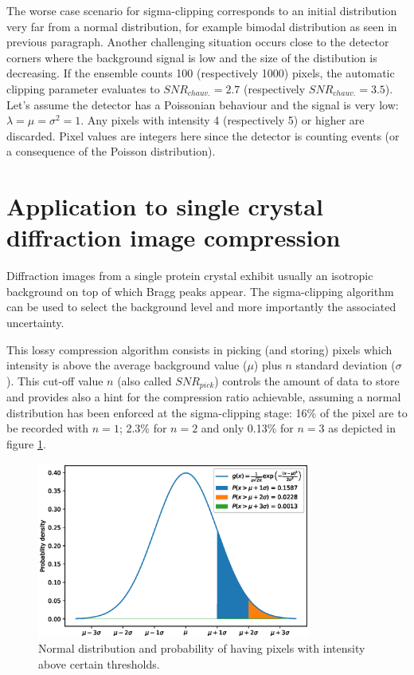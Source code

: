 \documentclass[preprint]{iucr}              %
\begin{document}
The worse case scenario for sigma-clipping corresponds to an initial distribution very far from a normal distribution, for example bimodal distribution as seen in previous paragraph.
Another challenging situation occurs close to the detector corners where the background signal is low and the size of the distibution is decreasing. 
If the ensemble counts 100 (respectively 1000) pixels, the automatic clipping parameter evaluates to $SNR_{chauv.} = 2.7$ (respectively $SNR_{chauv.} = 3.5$).
Let's assume the detector has a Poissonian behaviour and the signal is very low: $\lambda = \mu = \sigma^2 = 1$. 
Any pixels with intensity 4 (respectively 5) or higher are discarded. 
Pixel values are integers here since the detector is counting events (or a consequence of the Poisson distribution).

\section{Application to single crystal diffraction image compression}
Diffraction images from a single protein crystal exhibit usually an isotropic background on top of which Bragg peaks appear.
The sigma-clipping algorithm can be used to select the background level and more importantly the associated uncertainty.

This lossy compression algorithm consists in picking (and storing) pixels which intensity is above the average background value ($\mu$) plus $n$ standard deviation ($\sigma$). 
This cut-off value $n$ (also called $SNR_{pick}$) controls the amount of data to store and provides also a hint for the compression ratio achievable, assuming a normal distribution has been enforced at the sigma-clipping stage: 16\% of the pixel are to be recorded with $n=1$;  2.3\% for $n=2$ and only 0.13\% for $n=3$ as depicted in figure \ref{distribution}.
\begin{figure}
\label{distribution}
\begin{center}
\includegraphics[width=9cm]{distribution}
\caption{Normal distribution and probability of having pixels with intensity above certain thresholds.}
\end{center}
\end{figure}
\end{document}

